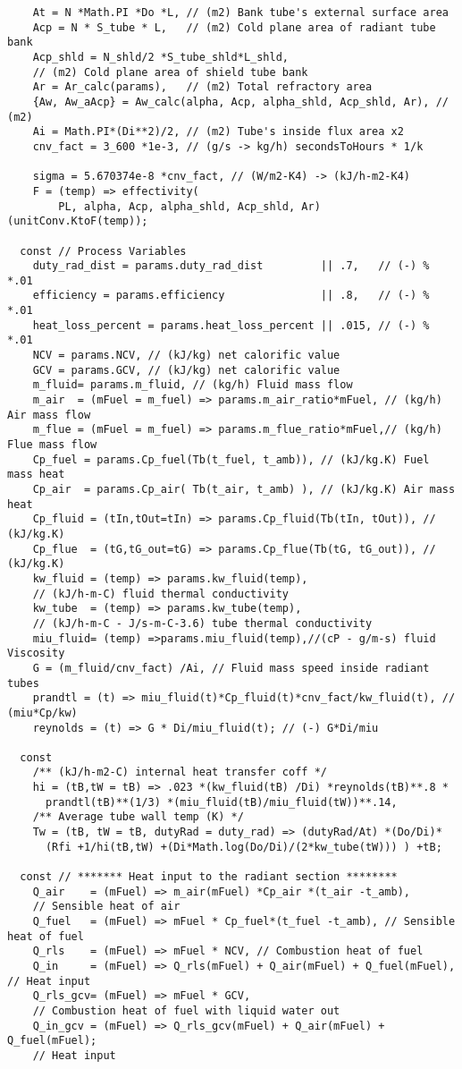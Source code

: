 \begin{verbatim}
    At = N *Math.PI *Do *L, // (m2) Bank tube's external surface area
    Acp = N * S_tube * L,   // (m2) Cold plane area of radiant tube bank
    Acp_shld = N_shld/2 *S_tube_shld*L_shld, 
    // (m2) Cold plane area of shield tube bank
    Ar = Ar_calc(params),   // (m2) Total refractory area
    {Aw, Aw_aAcp} = Aw_calc(alpha, Acp, alpha_shld, Acp_shld, Ar), // (m2)
    Ai = Math.PI*(Di**2)/2, // (m2) Tube's inside flux area x2
    cnv_fact = 3_600 *1e-3, // (g/s -> kg/h) secondsToHours * 1/k

    sigma = 5.670374e-8 *cnv_fact, // (W/m2-K4) -> (kJ/h-m2-K4)
    F = (temp) => effectivity(
        PL, alpha, Acp, alpha_shld, Acp_shld, Ar)(unitConv.KtoF(temp));

  const // Process Variables
    duty_rad_dist = params.duty_rad_dist         || .7,   // (-) % *.01
    efficiency = params.efficiency               || .8,   // (-) % *.01
    heat_loss_percent = params.heat_loss_percent || .015, // (-) % *.01
    NCV = params.NCV, // (kJ/kg) net calorific value
    GCV = params.GCV, // (kJ/kg) net calorific value
    m_fluid= params.m_fluid, // (kg/h) Fluid mass flow
    m_air  = (mFuel = m_fuel) => params.m_air_ratio*mFuel, // (kg/h) Air mass flow
    m_flue = (mFuel = m_fuel) => params.m_flue_ratio*mFuel,// (kg/h) Flue mass flow
    Cp_fuel = params.Cp_fuel(Tb(t_fuel, t_amb)), // (kJ/kg.K) Fuel mass heat
    Cp_air  = params.Cp_air( Tb(t_air, t_amb) ), // (kJ/kg.K) Air mass heat
    Cp_fluid = (tIn,tOut=tIn) => params.Cp_fluid(Tb(tIn, tOut)), // (kJ/kg.K)
    Cp_flue  = (tG,tG_out=tG) => params.Cp_flue(Tb(tG, tG_out)), // (kJ/kg.K)
    kw_fluid = (temp) => params.kw_fluid(temp),
    // (kJ/h-m-C) fluid thermal conductivity
    kw_tube  = (temp) => params.kw_tube(temp), 
    // (kJ/h-m-C - J/s-m-C-3.6) tube thermal conductivity
    miu_fluid= (temp) =>params.miu_fluid(temp),//(cP - g/m-s) fluid Viscosity
    G = (m_fluid/cnv_fact) /Ai, // Fluid mass speed inside radiant tubes
    prandtl = (t) => miu_fluid(t)*Cp_fluid(t)*cnv_fact/kw_fluid(t), // (miu*Cp/kw)
    reynolds = (t) => G * Di/miu_fluid(t); // (-) G*Di/miu
  
  const 
    /** (kJ/h-m2-C) internal heat transfer coff */
    hi = (tB,tW = tB) => .023 *(kw_fluid(tB) /Di) *reynolds(tB)**.8 *
      prandtl(tB)**(1/3) *(miu_fluid(tB)/miu_fluid(tW))**.14,
    /** Average tube wall temp (K) */
    Tw = (tB, tW = tB, dutyRad = duty_rad) => (dutyRad/At) *(Do/Di)* 
      (Rfi +1/hi(tB,tW) +(Di*Math.log(Do/Di)/(2*kw_tube(tW))) ) +tB;

  const // ******* Heat input to the radiant section ********
    Q_air    = (mFuel) => m_air(mFuel) *Cp_air *(t_air -t_amb), 
    // Sensible heat of air
    Q_fuel   = (mFuel) => mFuel * Cp_fuel*(t_fuel -t_amb), // Sensible heat of fuel
    Q_rls    = (mFuel) => mFuel * NCV, // Combustion heat of fuel
    Q_in     = (mFuel) => Q_rls(mFuel) + Q_air(mFuel) + Q_fuel(mFuel), // Heat input
    Q_rls_gcv= (mFuel) => mFuel * GCV, 
    // Combustion heat of fuel with liquid water out
    Q_in_gcv = (mFuel) => Q_rls_gcv(mFuel) + Q_air(mFuel) + Q_fuel(mFuel); 
    // Heat input
  

\end{verbatim}
